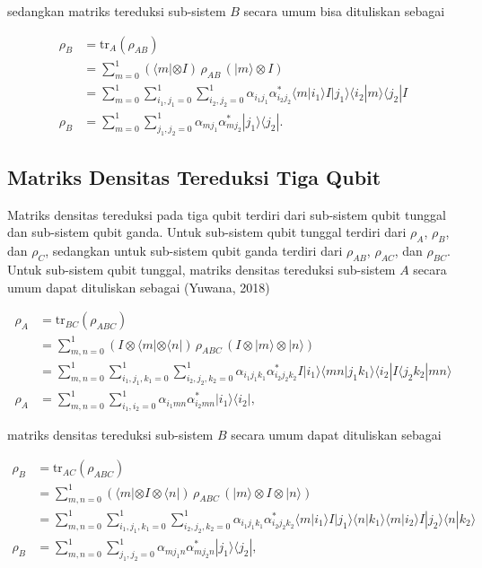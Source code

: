 sedangkan matriks tereduksi sub-sistem $B$ secara umum bisa dituliskan sebagai

\begin{align}
\rho_B &= \mathrm{tr}_A(\rho_{AB}) \nonumber \\
&= \sum_{m=0}^{1} (\langle m| \otimes I)\, \rho_{AB}\, (|m\rangle \otimes I) \nonumber \\
&= \sum_{m=0}^{1} \sum_{i_1,j_1=0}^{1} \sum_{i_2,j_2=0}^{1}
\alpha_{i_1 j_1}\alpha^{*}_{i_2 j_2}
\langle m|i_1\rangle I |j_1\rangle \langle i_2|m\rangle \langle j_2| I \nonumber \\
\rho_B &= \sum_{m=0}^{1} \sum_{j_1,j_2=0}^{1}
\alpha_{m j_1}\alpha^{*}_{m j_2}
|j_1\rangle \langle j_2| .
\end{align}

\subsection{Matriks Densitas Tereduksi Tiga Qubit}

Matriks densitas tereduksi pada tiga qubit terdiri dari sub-sistem qubit tunggal dan sub-sistem qubit ganda. Untuk sub-sistem qubit tunggal terdiri dari $\rho_A$, $\rho_B$, dan $\rho_C$, sedangkan untuk sub-sistem qubit ganda terdiri dari $\rho_{AB}$, $\rho_{AC}$, dan $\rho_{BC}$. Untuk sub-sistem qubit tunggal, matriks densitas tereduksi sub-sistem $A$ secara umum dapat dituliskan sebagai (Yuwana, 2018)

\begin{align}
\rho_A &= \mathrm{tr}_{BC}(\rho_{ABC}) \nonumber \\
&= \sum_{m,n=0}^{1} (I \otimes \langle m| \otimes \langle n|)\, \rho_{ABC}\, (I \otimes |m\rangle \otimes |n\rangle) \nonumber \\
&= \sum_{m,n=0}^{1} \sum_{i_1,j_1,k_1=0}^{1} \sum_{i_2,j_2,k_2=0}^{1}
\alpha_{i_1 j_1 k_1}\alpha^{*}_{i_2 j_2 k_2}
I |i_1\rangle \langle mn|j_1 k_1\rangle \langle i_2| I \langle j_2 k_2|mn\rangle \nonumber \\
\rho_A &= \sum_{m,n=0}^{1} \sum_{i_1,i_2=0}^{1}
\alpha_{i_1 m n}\alpha^{*}_{i_2 m n}
|i_1\rangle \langle i_2| ,
\end{align}

matriks densitas tereduksi sub-sistem $B$ secara umum dapat dituliskan sebagai

\begin{align}
\rho_B &= \mathrm{tr}_{AC}(\rho_{ABC}) \nonumber \\
&= \sum_{m,n=0}^{1} (\langle m| \otimes I \otimes \langle n|)\, \rho_{ABC}\, (|m\rangle \otimes I \otimes |n\rangle) \nonumber \\
&= \sum_{m,n=0}^{1} \sum_{i_1,j_1,k_1=0}^{1} \sum_{i_2,j_2,k_2=0}^{1}
\alpha_{i_1 j_1 k_1}\alpha^{*}_{i_2 j_2 k_2}
\langle m|i_1\rangle I |j_1\rangle \langle n|k_1\rangle
\langle m|i_2\rangle I |j_2\rangle \langle n|k_2\rangle \nonumber \\
\rho_B &= \sum_{m,n=0}^{1} \sum_{j_1,j_2=0}^{1}
\alpha_{m j_1 n}\alpha^{*}_{m j_2 n}
|j_1\rangle \langle j_2| ,
\end{align}

